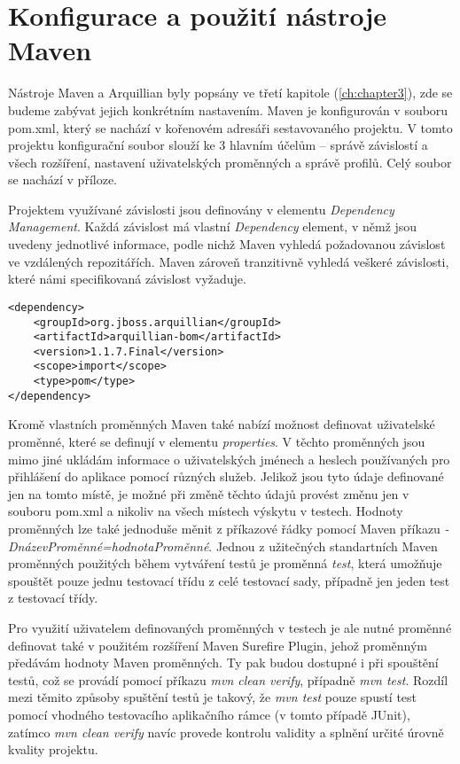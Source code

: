 \documentclass[
    color,   %
	table,   %
    twoside, %
    nolot, nolof
]{fithesis3}
\begin{document}
\section{Konfigurace a použití nástroje Maven}
\label{sec:5.2}
Nástroje Maven a Arquillian byly popsány ve třetí kapitole (\ref{ch:chapter3}), zde se budeme zabývat jejich konkrétním nastavením. Maven je konfigurován v souboru pom.xml, který se nachází v kořenovém adresáři sestavovaného projektu. V tomto projektu konfigurační soubor slouží ke 3 hlavním účelům – správě závislostí a všech rozšíření, nastavení uživatelských proměnných a správě profilů. Celý soubor se nachází v příloze.

Projektem využívané závislosti jsou definovány v elementu \emph{Dependency Management}. Každá závislost má vlastní \emph{Dependency} element, v němž jsou uvedeny jednotlivé informace, podle nichž Maven vyhledá požadovanou závislost ve vzdálených repozitářích. Maven zároveň tranzitivně vyhledá veškeré závislosti, které námi specifikovaná závislost vyžaduje.

\begin{lstlisting}
<dependency>
	<groupId>org.jboss.arquillian</groupId>
	<artifactId>arquillian-bom</artifactId>
	<version>1.1.7.Final</version>
	<scope>import</scope>
	<type>pom</type>
</dependency>
\end{lstlisting} 

Kromě vlastních proměnných Maven také nabízí možnost definovat uživatelské proměnné, které se definují v elementu \emph{properties}. V těchto proměnných jsou mimo jiné ukládám informace o uživatelských jménech a heslech používaných pro přihlášení do aplikace pomocí různých služeb. Jelikož jsou tyto údaje definované jen na tomto místě, je možné při změně těchto údajů provést změnu jen v souboru pom.xml a nikoliv na všech místech výskytu v testech. Hodnoty proměnných lze také jednoduše měnit z příkazové řádky pomocí Maven příkazu \emph{-DnázevProměnné=hodnotaProměnné}. Jednou z užitečných standartních Maven proměnných použitých během vytváření testů je proměnná \emph{test}, která umožňuje spouštět pouze jednu testovací třídu z celé testovací sady, případně jen jeden test z testovací třídy.

Pro využití uživatelem definovaných proměnných v testech je ale nutné proměnné definovat také v použitém rozšíření Maven Surefire Plugin, jehož proměnným předávám hodnoty Maven proměnných. Ty pak budou dostupné i při spouštění testů, což se provádí pomocí příkazu \emph{mvn clean verify}, případně \emph{mvn test}. Rozdíl mezi těmito způsoby spuštění testů je takový, že \emph{mvn test} pouze spustí test pomocí vhodného testovacího aplikačního rámce (v tomto případě JUnit), zatímco \emph{mvn clean verify} navíc provede kontrolu validity a splnění určité úrovně kvality projektu.
\end{document}
